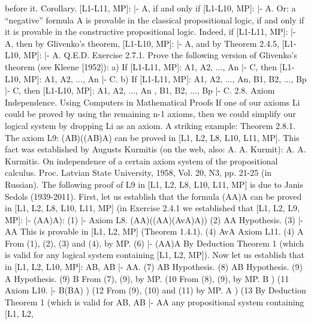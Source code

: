 before it.
Corollary. [L1-L11, MP]: |- \neg A, if and only if [L1-L10, MP]: |- \neg A. Or: a ``negative'' formula \neg A is
provable in the classical propositional logic, if and only if it is provable in the constructive propositional
logic.
Indeed, if [L1-L11, MP]: |- \neg A, then by Glivenko's theorem, [L1-L10, MP]: |- \neg \neg \neg A, and by Theorem
2.4.5, [L1-L10, MP]: |- \neg A. Q.E.D.
Exercise 2.7.1. Prove the following version of Glivenko's theorem (see Kleene [1952]):
a) If [L1-L11, MP]: A1, A2, ..., An |- C, then [L1-L10, MP]: \neg \neg A1, \neg \neg A2, ..., \neg \neg An |- \neg \neg C.
b) If [L1-L11, MP]: \neg A1, \neg A2, ..., \neg An, B1, B2, ..., Bp |- \neg C, then [L1-L10, MP]: \neg A1, \neg A2, ..., \neg An , \neg \neg B1,
\neg \neg B2, ..., \neg \neg Bp |- \neg C.
2.8. Axiom Independence. Using Computers in Mathematical Proofs
If one of our axioms Li could be proved by using the remaining n-1 axioms, then we could simplify our
logical system by dropping Li as an axiom. A striking example:
Theorem 2.8.1. The axiom L9: (A\IMPLIES B)\IMPLIES ((A\IMPLIES \neg B)\IMPLIES \neg A) can be proved in [L1, L2, L8, L10, L11, MP].
This fact was established by Augusts Kurmitis (on the web, also: A. A. Kurmit):
A. A. Kurmitis. On independence of a certain axiom system of the propositional calculus. Proc. Latvian State University,
1958, Vol. 20, N3, pp. 21-25 (in Russian).
The following proof of L9 in [L1, L2, L8, L10, L11, MP] is due to Janis Sedols (1939-2011).
First, let us establish that the formula (A\IMPLIES \neg A)\IMPLIES \neg A can be proved in [L1, L2, L8, L10, L11, MP] (in
Exercise 2.4.1 we established that [L1, L2, L9, MP]: |- (A\IMPLIES \neg A)\IMPLIES \neg A):
(1)
|-
Axiom L8.
(A\IMPLIES \neg A)\IMPLIES ((\neg A\IMPLIES \neg A)\IMPLIES (Av\neg A)\IMPLIES \neg A))
(2) A\IMPLIES \neg A Hypothesis.
(3) |- \neg A\IMPLIES \neg A This is provable in [L1, L2, MP] (Theorem
                1.4.1).
(4) Av\neg A Axiom L11.
(4) \neg A From (1), (2), (3) and (4), by MP.
(6) |- (A\IMPLIES \neg A)\IMPLIES \neg A By Deduction Theorem 1 (which is valid for
                      any logical system containing [L1, L2, MP]).
Now let us establish that in [L1, L2, L10, MP]: A\IMPLIES B, A\IMPLIES \neg B |- A\IMPLIES \neg A.
(7) A\IMPLIES B Hypothesis.
(8) A\IMPLIES \neg B Hypothesis.
(9) A Hypothesis.
(9) B From (7), (9), by MP.
(10 From (8), (9), by MP.
\neg B 
 ) 
(11 Axiom L10.
|- \neg B\IMPLIES (B\IMPLIES \neg A) 
      ) 
(12 From (9), (10) and (11) by MP.
\neg A 
 ) 
(13 By Deduction Theorem 1 (which is valid for
A\IMPLIES B, A\IMPLIES \neg B |- A\IMPLIES \neg A any propositional system containing [L1, L2,
